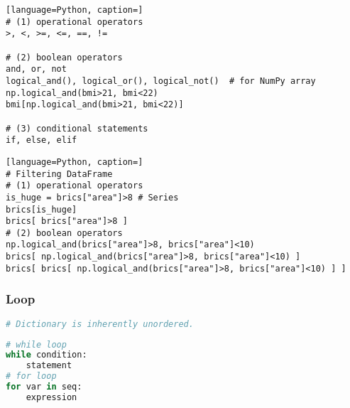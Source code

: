 \documentclass[12pt]{article}
\begin{document}
\begin{lstlisting}[language=Python, caption=]
# (1) operational operators
>, <, >=, <=, ==, !=

# (2) boolean operators
and, or, not
logical_and(), logical_or(), logical_not()  # for NumPy array
np.logical_and(bmi>21, bmi<22)
bmi[np.logical_and(bmi>21, bmi<22)]

# (3) conditional statements
if, else, elif
\end{lstlisting}

\begin{lstlisting}[language=Python, caption=]
# Filtering DataFrame
# (1) operational operators
is_huge = brics["area"]>8 # Series
brics[is_huge]
brics[ brics["area"]>8 ]
# (2) boolean operators
np.logical_and(brics["area"]>8, brics["area"]<10)
brics[ np.logical_and(brics["area"]>8, brics["area"]<10) ]
brics[ brics[ np.logical_and(brics["area"]>8, brics["area"]<10) ] ]
\end{lstlisting}

\subsubsection{\normalsize Loop}
\begin{lstlisting}[language=Python]
# Dictionary is inherently unordered.
\end{lstlisting}

\begin{lstlisting}[language=Python]
# while loop
while condition:
    statement
# for loop
for var in seq: 
    expression
\end{lstlisting}
\end{document}
